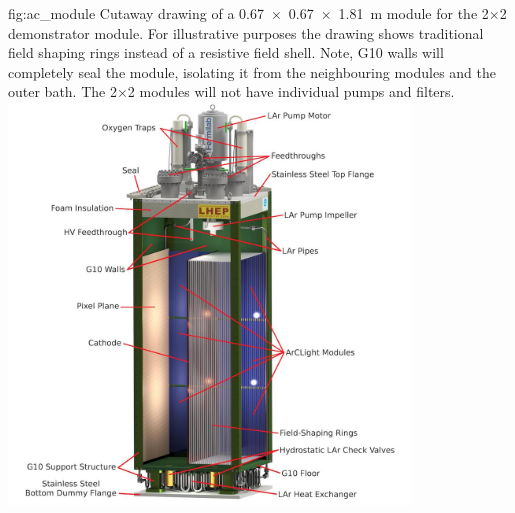 \begin{dunefigure}{fig:ac_module}
{Cutaway drawing of a \SI{0.67 x 0.67 x 1.81}{\metre}  module for the 2$\times$2 demonstrator module. For illustrative purposes the drawing shows traditional field shaping rings instead of a resistive field shell. Note, G10 walls will completely seal the module, isolating it from the neighbouring modules and the outer  bath. %
The 2$\times$2 modules will not have individual pumps and filters.}
\includegraphics[width=0.8\textwidth]{graphics/Normal-Module-4K_labelled.jpeg}
\end{dunefigure}

